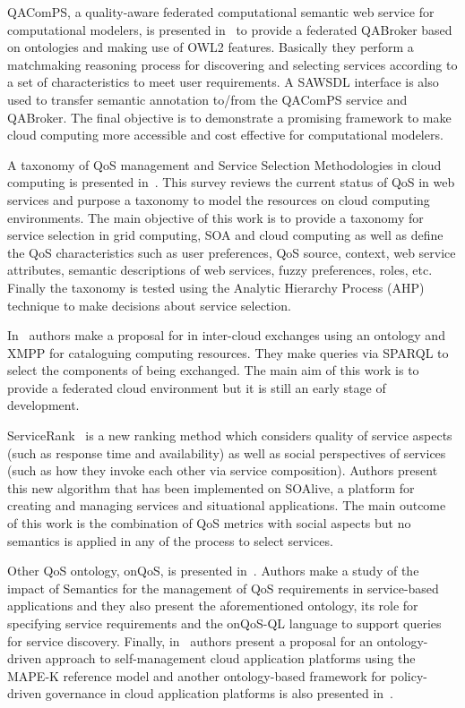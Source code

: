 QAComPS, a quality-aware federated computational semantic web service for 
computational  modelers, is presented in~\cite{dewqacomps} to provide a 
federated QABroker based on ontologies and making use of OWL2 features. 
Basically they perform a matchmaking reasoning process for discovering and 
selecting services according to a set of characteristics to meet user 
requirements. A SAWSDL interface is also used to transfer semantic annotation 
to/from the QAComPS service and QABroker. The final objective is to demonstrate 
a promising framework to make cloud computing more accessible and cost effective 
for computational modelers.

A taxonomy of QoS management and Service Selection Methodologies in cloud 
computing is presented in~\cite{qos-taxonomy}. This survey reviews the current 
status of QoS in web services and purpose a taxonomy to model the resources on 
cloud computing environments. The main objective of this work is to provide a 
taxonomy for service selection in grid computing, SOA and cloud computing as 
well as define the QoS characteristics such as user preferences, QoS source, 
context, web service attributes, semantic descriptions of web services, fuzzy 
preferences, roles, etc. Finally the taxonomy is tested using the Analytic 
Hierarchy Process (AHP) technique to make decisions about service selection.

In~\cite{DBLP:conf/ic/BernsteinV10} authors make a proposal for in inter-cloud 
exchanges using an ontology and XMPP for cataloguing computing resources. They 
make queries via SPARQL to select the components of being exchanged. The main 
aim of this work is to provide a federated cloud environment but it is still an 
early stage of development.

ServiceRank~\cite{Wu:2009:CQS:1696051.1696105} is a new ranking method which 
considers quality of service aspects (such as response time and availability) as 
well as social perspectives of services (such as how they invoke each other via 
service composition). Authors present this new algorithm that has been 
implemented on SOAlive, a platform for creating and managing services and 
situational applications. The main outcome of this work is the combination of 
QoS metrics with social aspects but no semantics is applied in any of the 
process to select services. 

Other QoS ontology, onQoS, is presented in~\cite{Damiano:2009:OQL:1506129.150614}. Authors make a study of the impact of 
Semantics for the management of QoS requirements in service-based 
applications and they also present the aforementioned ontology, its role for 
specifying service requirements and the onQoS-QL language to support queries for 
service discovery. Finally, in~\cite{Dautov:2013:ASC:2462307.2462312} authors present a proposal for an 
ontology-driven approach to self-management cloud application platforms using 
the MAPE-K reference model and another ontology-based framework for policy-driven 
governance in cloud application platforms is also presented 
in~\cite{DBLP:conf/icsoc/KourtesisP11}.


